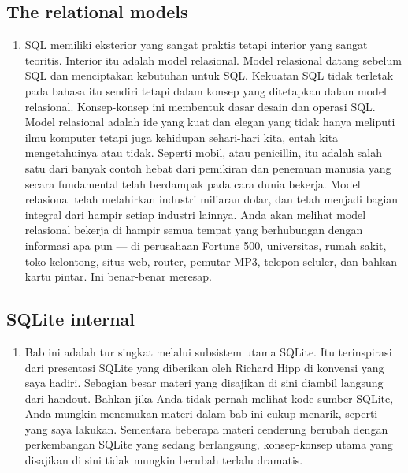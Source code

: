 \begin{enumerate}
		\subsection{The relational models}
		\begin{enumerate}
		\item SQL memiliki eksterior yang sangat praktis tetapi interior yang sangat teoritis. Interior itu adalah model relasional. Model relasional datang sebelum SQL dan menciptakan kebutuhan untuk SQL. Kekuatan SQL tidak terletak pada bahasa itu sendiri tetapi dalam konsep yang ditetapkan dalam model relasional. Konsep-konsep ini membentuk dasar desain dan operasi SQL. Model relasional adalah ide yang kuat dan elegan yang tidak hanya meliputi ilmu komputer tetapi juga kehidupan sehari-hari kita, entah kita mengetahuinya atau tidak. Seperti mobil, atau penicillin, itu adalah salah satu dari banyak contoh hebat dari pemikiran dan penemuan manusia yang secara fundamental telah berdampak pada cara dunia bekerja. Model relasional telah melahirkan industri miliaran dolar, dan telah menjadi bagian integral dari hampir setiap industri lainnya. Anda akan melihat model relasional bekerja di hampir semua tempat yang berhubungan dengan informasi apa pun — di perusahaan Fortune 500, universitas, rumah sakit, toko kelontong, situs web, router, pemutar MP3, telepon seluler, dan bahkan kartu pintar. Ini benar-benar meresap.
		\end{enumerate}
	\subsection{SQLite internal}
	\begin{enumerate}
	\item Bab ini adalah tur singkat melalui subsistem utama SQLite. Itu terinspirasi dari presentasi SQLite yang diberikan oleh Richard Hipp di konvensi yang saya hadiri. Sebagian besar materi yang disajikan di sini diambil langsung dari handout. Bahkan jika Anda tidak pernah melihat kode sumber SQLite, Anda mungkin menemukan materi dalam bab ini cukup menarik, seperti yang saya lakukan. Sementara beberapa materi cenderung berubah dengan perkembangan SQLite yang sedang berlangsung, konsep-konsep utama yang disajikan di sini tidak mungkin berubah terlalu dramatis.
	\end{enumerate}

\end{enumerate}
